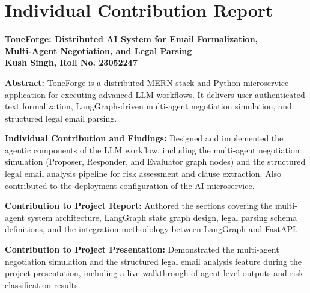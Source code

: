 \documentclass[12pt,a4paper]{report}
\begin{document}

\titleformat{\chapter}[display]
{\normalfont\LARGE\bfseries}{\chaptertitlename\ \thechapter}{20pt}{\LARGE}

\clearpage
\chapter*{Individual Contribution Report}
\begin{center}
	{\large \textbf{ToneForge: Distributed AI System for Email Formalization,\\Multi-Agent Negotiation, and Legal Parsing}}\\[0.5cm]
	{\large \textbf{Kush Singh, Roll No. 23052247}}\\[0.2cm]
\end{center}

\vspace{0.5cm}
\noindent \textbf{Abstract:}
ToneForge is a distributed MERN-stack and Python microservice application for executing advanced LLM workflows. It delivers user-authenticated text formalization, LangGraph-driven multi-agent negotiation simulation, and structured legal email parsing.

\vspace{0.5cm}
\noindent \textbf{Individual Contribution and Findings:}
Designed and implemented the agentic components of the LLM workflow, including the multi-agent negotiation simulation (Proposer, Responder, and Evaluator graph nodes) and the structured legal email analysis pipeline for risk assessment and clause extraction. Also contributed to the deployment configuration of the AI microservice.

\vspace{0.5cm}
\noindent \textbf{Contribution to Project Report:}
Authored the sections covering the multi-agent system architecture, LangGraph state graph design, legal parsing schema definitions, and the integration methodology between LangGraph and FastAPI.

\vspace{0.5cm}
\noindent \textbf{Contribution to Project Presentation:}
Demonstrated the multi-agent negotiation simulation and the structured legal email analysis feature during the project presentation, including a live walkthrough of agent-level outputs and risk classification results.
\end{document}
